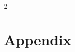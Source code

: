 \documentclass[9pt]{pnas-new}
\begin{document}

\vspace{0pt}
\begin{multicols}{2}
\section*{\bibname}

\end{multicols}

\clearpage
\appendix
\section*{Appendix}

\end{document}
